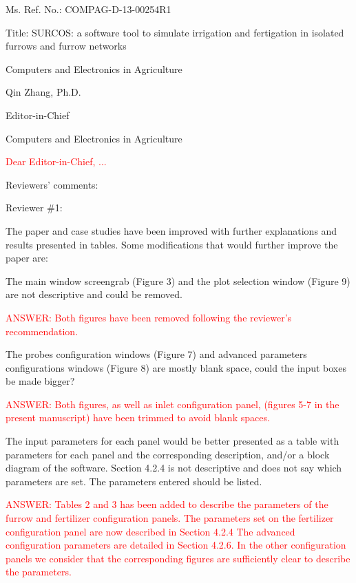 \documentclass[a4paper]{article}
\begin{document}
Ms. Ref. No.:  COMPAG-D-13-00254R1

Title: SURCOS: a software tool to simulate irrigation and fertigation in isolated furrows and furrow networks

Computers and Electronics in Agriculture

Qin Zhang, Ph.D.

Editor-in-Chief

Computers and Electronics in Agriculture

\textcolor{red}{Dear Editor-in-Chief, ...}

\vspace{5mm}

Reviewers' comments:

\vspace{5mm}

Reviewer \#1:

The paper and case studies have been improved with further explanations and results presented in tables. Some modifications that would further improve the paper are:

The main window screengrab (Figure 3) and the plot selection window (Figure 9) are not descriptive and could be removed.

\textcolor{red}{ANSWER: Both figures have been removed following the reviewer's recommendation.}

The probes configuration windows (Figure 7) and advanced parameters configurations windows (Figure 8) are mostly blank space, could the input boxes be made bigger? 

\textcolor{red}{ANSWER: Both figures, as well as inlet configuration panel, (figures 5-7 in the present manuscript) have been trimmed to avoid blank spaces.} 

The input parameters for each panel would be better presented as a table with parameters for each panel and the corresponding description, and/or a block diagram of the software. 
Section 4.2.4 is not descriptive and does not say which parameters are set. The parameters entered should be listed.


\textcolor{red}{ANSWER: Tables 2 and 3 has been added to describe the parameters of the furrow and fertilizer configuration panels. The parameters set on the
fertilizer configuration panel are now described in Section 4.2.4  The advanced configuration parameters are detailed in Section 4.2.6. In the other configuration panels we consider that the corresponding figures are sufficiently clear to describe the parameters.}
\end{document}
